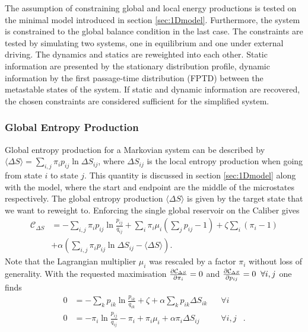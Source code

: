 The assumption of constraining global and local energy productions is tested on the minimal model introduced in section \ref{sec:1Dmodel}. Furthermore, the system is constrained to the global balance condition in the last case. The constraints are tested by simulating two systems, one in equilibrium and one under external driving. The dynamics and statics are reweighted into each other. Static information are presented by the stationary distribution profile, dynamic information by the first passage-time distribution (FPTD) between the metastable states of the system. If static and dynamic information are recovered, the chosen constraints are considered sufficient for the simplified system. 

\subsubsection{Global Entropy Production}
Global entropy production for a Markovian system can be described by 
$\langle \Delta S \rangle = \sum_{i,j}  \pi_i p_{ij} \ln  \Delta S_{ij} $, where $\Delta S_{ij}$ 
is the local entropy production when going from state $i$ to state $j$. This quantity is discussed in section \ref{sec:1Dmodel} along with the model, where the start and endpoint are the middle of the microstates respectively. The global entropy production $\langle \Delta S \rangle$ is given by the target state that we want to reweight to. 
Enforcing the single global reservoir on the Caliber gives 
\begin{equation}
\begin{aligned}
 \mathcal{C}_{\Delta S} &= -\sum_{i,j} \pi_i p_{ij} \ln \frac{p_{ij}}{q_{ij}} 
      +  \sum_i \pi_i \mu_i \left( \sum_j p_{ij} - 1 \right) + \zeta \sum_i ( \pi_i -1) \\
      &+ \alpha \left ( \sum_{i,j}  \pi_i p_{ij} \ln \Delta S_{ij} - \langle \Delta S \rangle \right ).
\end{aligned}
\end{equation}
Note that the Lagrangian multiplier $\mu_i$ was rescaled by a factor $\pi_i$ without loss 
of generality.
With the requested maximisation $\pdv{ \mathcal{C}_{\Delta S}}{\pi_i}=0$ and 
$\pdv{ \mathcal{C}_{\Delta S}}{p_{ij}}=0 \;\; \forall i,j$ one finds
\begin{equation}
\begin{aligned}
0 &= - \sum_{k} p_{ik} \ln \frac{p_{ik}}{q_{ik}} + \zeta  
+ \alpha \sum_k p_{ik} \Delta S_{ik} \;\;\;& \forall i&\\
0 &= - \pi_i \ln \frac{p_{ij}}{q_{ij}}- \pi_i + \pi_i \mu_i  + \alpha \pi_i \Delta S_{ij} \;\;\;& \forall i,j& . 
\end{aligned}
\end{equation}
